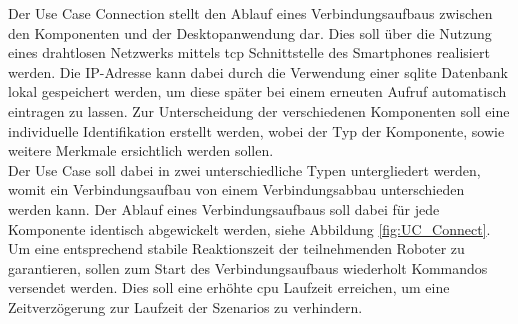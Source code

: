 Der Use Case Connection stellt den Ablauf eines Verbindungsaufbaus zwischen den Komponenten und der Desktopanwendung dar. Dies soll über die Nutzung eines drahtlosen Netzwerks mittels \gls{tcp} Schnittstelle des Smartphones realisiert werden. Die IP-Adresse kann dabei durch die Verwendung einer \gls{sqlite} Datenbank lokal gespeichert werden, um diese später bei einem erneuten Aufruf automatisch eintragen zu lassen. Zur Unterscheidung der verschiedenen Komponenten soll eine individuelle Identifikation erstellt werden, wobei der Typ der Komponente, sowie weitere Merkmale ersichtlich werden sollen.\\
Der Use Case soll dabei in zwei unterschiedliche Typen untergliedert werden, womit ein Verbindungsaufbau von einem Verbindungsabbau unterschieden werden kann. Der Ablauf eines Verbindungsaufbaus soll dabei für jede Komponente identisch abgewickelt werden, siehe Abbildung \eqref{fig:UC_Connect}. Um eine entsprechend stabile Reaktionszeit der teilnehmenden Roboter zu garantieren, sollen zum Start des Verbindungsaufbaus wiederholt Kommandos versendet werden. Dies soll eine erhöhte \gls{cpu} Laufzeit erreichen, um eine Zeitverzögerung zur Laufzeit der Szenarios zu verhindern.\\

